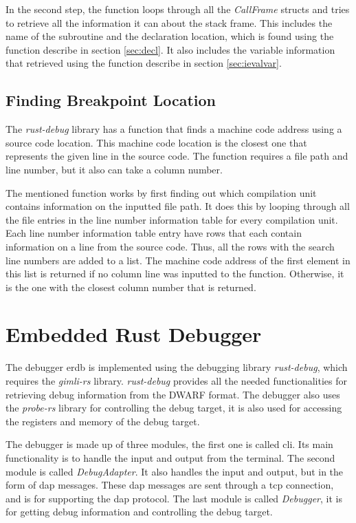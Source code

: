 In the second step, the function loops through all the \emph{CallFrame} structs and tries to retrieve all the information it can about the stack frame.
This includes the name of the subroutine and the declaration location, which is found using the function describe in section \ref{sec:decl}.
It also includes the variable information that retrieved using the function describe in section \ref{sec:ievalvar}.



\subsection{Finding Breakpoint Location}
The \emph{rust-debug} library has a function that finds a machine code address using a source code location.
This machine code location is the closest one that represents the given line in the source code.
The function requires a file path and line number, but it also can take a column number.


The mentioned function works by first finding out which compilation unit contains information on the inputted file path.
It does this by looping through all the file entries in the line number information table for every compilation unit.
Each line number information table entry have rows that each contain information on a line from the source code.
Thus, all the rows with the search line numbers are added to a list.
The machine code address of the first element in this list is returned if no column line was inputted to the function.
Otherwise, it is the one with the closest column number that is returned.




\section{Embedded Rust Debugger}
The debugger \acrfull{erdb} is implemented using the debugging library \emph{rust-debug}, which requires the \emph{gimli-rs} library.
\emph{rust-debug} provides all the needed functionalities for retrieving debug information from the \gls{DWARF} format.
The debugger also uses the \emph{probe-rs} library for controlling the debug target, it is also used for accessing the registers and memory of the debug target.


The debugger is made up of three modules, the first one is called \acrshort{cli}.
Its main functionality is to handle the input and output from the terminal.
The second module is called \emph{DebugAdapter}.
It also handles the input and output, but in the form of \gls{dap} messages.
These \gls{dap} messages are sent through a \acrshort{tcp} connection, and is for supporting the \gls{dap} protocol.
The last module is called \emph{Debugger}, it is for getting debug information and controlling the debug target.



